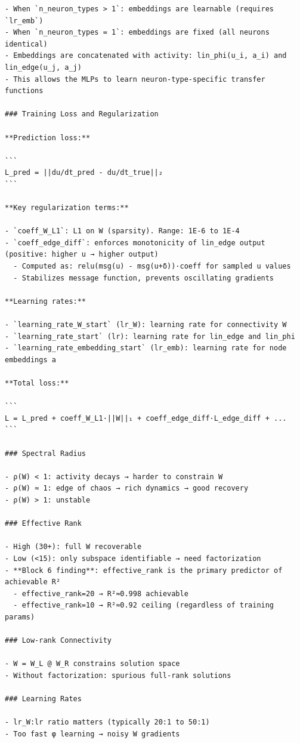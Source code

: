 \documentclass[10pt,twocolumn]{article}
\begin{document}
\begin{small}
\begin{verbatim}
- When `n_neuron_types > 1`: embeddings are learnable (requires `lr_emb`)
- When `n_neuron_types = 1`: embeddings are fixed (all neurons identical)
- Embeddings are concatenated with activity: lin_phi(u_i, a_i) and lin_edge(u_j, a_j)
- This allows the MLPs to learn neuron-type-specific transfer functions

### Training Loss and Regularization

**Prediction loss:**

```
L_pred = ||du/dt_pred - du/dt_true||₂
```

**Key regularization terms:**

- `coeff_W_L1`: L1 on W (sparsity). Range: 1E-6 to 1E-4
- `coeff_edge_diff`: enforces monotonicity of lin_edge output (positive: higher u → higher output)
  - Computed as: relu(msg(u) - msg(u+δ))·coeff for sampled u values
  - Stabilizes message function, prevents oscillating gradients

**Learning rates:**

- `learning_rate_W_start` (lr_W): learning rate for connectivity W
- `learning_rate_start` (lr): learning rate for lin_edge and lin_phi
- `learning_rate_embedding_start` (lr_emb): learning rate for node embeddings a

**Total loss:**

```
L = L_pred + coeff_W_L1·||W||₁ + coeff_edge_diff·L_edge_diff + ...
```

### Spectral Radius

- ρ(W) < 1: activity decays → harder to constrain W
- ρ(W) ≈ 1: edge of chaos → rich dynamics → good recovery
- ρ(W) > 1: unstable

### Effective Rank

- High (30+): full W recoverable
- Low (<15): only subspace identifiable → need factorization
- **Block 6 finding**: effective_rank is the primary predictor of achievable R²
  - effective_rank=20 → R²≈0.998 achievable
  - effective_rank=10 → R²≈0.92 ceiling (regardless of training params)

### Low-rank Connectivity

- W = W_L @ W_R constrains solution space
- Without factorization: spurious full-rank solutions

### Learning Rates

- lr_W:lr ratio matters (typically 20:1 to 50:1)
- Too fast φ learning → noisy W gradients

\end{verbatim}
\end{small}
\end{document}
